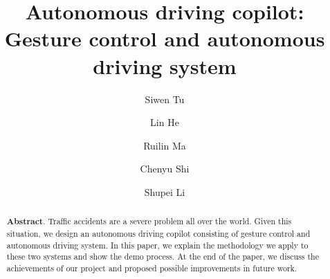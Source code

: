 \documentclass[acmsmall]{acmart}
\begin{document}
\title[Autonomous Driving Copilot]{Autonomous driving copilot: Gesture control and autonomous driving system}

\author{Siwen Tu}
\author{Lin He}
\author{Ruilin Ma}
\author{Chenyu Shi}
\author{Shupei Li}


\renewcommand{\shortauthors}{S. Tu, L. He, R. Ma, C. Shi and S. Li}

\begin{abstract}
    \textbf{Abstract}. Traffic accidents are a severe problem all over the world. Given this situation, we design an autonomous driving copilot consisting of gesture control and autonomous driving system. In this paper, we explain the methodology we apply to these two systems and show the demo process. At the end of the paper, we discuss the achievements of our project and proposed possible improvements in future work.
\end{abstract}



\maketitle
\end{document}
